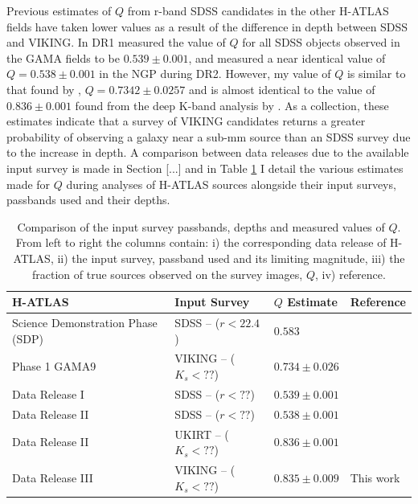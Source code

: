 Previous estimates of $Q$ from r-band SDSS candidates in the other H-ATLAS fields have taken lower values as a result of the difference in depth between SDSS and VIKING. In DR1 \citealt{Bourne_2016} measured the value of $Q$ for all SDSS objects observed in the GAMA fields to be $0.539\pm0.001$, and \citealt{Furlanetto_2018} measured a near identical value of $Q=0.538\pm0.001$ in the NGP during DR2. However, my value of $Q$ is similar to that found by \citealt{Fleuren_2012}, $Q = 0.7342\pm0.0257$ and is almost identical to the value of $0.836\pm0.001$ found from the deep K-band analysis by \citealt{Furlanetto_2018}. As a collection, these estimates indicate that a survey of VIKING candidates returns a greater probability of observing a galaxy near a sub-mm source than an SDSS survey due to the increase in depth. A comparison between data releases due to the available input survey is made in Section [...] and in Table \ref{tab:data_release_input_surveys} I detail the various estimates made for $Q$ during analyses of H-ATLAS sources alongside their input surveys, passbands used and their depths.

\begin{table}
\centering
\begin{tabular}{|p{6.5cm}|p{3.5cm}|p{2.5cm}|p{4cm}|}
    \hline
    H-ATLAS & Input Survey & $Q$ Estimate & Reference \\
    \hline
    \hline
    Science Demonstration Phase (SDP) & SDSS -- ($r < 22.4$) & $0.583$ & \citealt{Smith_2011} \\ 
    Phase 1 GAMA9 & VIKING -- ($K_s < ??$) & $0.734\pm0.026$ & \citealt{Fleuren_2012} \\
    Data Release I & SDSS -- ($r < ??$) & $0.539\pm0.001$ & \citealt{Bourne_2016} \\
    Data Release II & SDSS -- ($r < ??$) & $0.538\pm0.001$ & \citealt{Furlanetto_2018} \\
    Data Release II & UKIRT -- ($K_s < ??$) & $0.836\pm0.001$ & \citealt{Furlanetto_2018} \\
    Data Release III & VIKING -- ($K_s < ??$) & $0.835\pm0.009$ & This work \\
    \hline
\end{tabular}
\caption{Comparison of the input survey passbands, depths and measured values of $Q$. From left to right the columns contain: i) the corresponding data release of H-ATLAS, ii) the input survey, passband used and its limiting magnitude, iii) the fraction of true sources observed on the survey images, $Q$, iv) reference.}
\label{tab:data_release_input_surveys}
\end{table}


